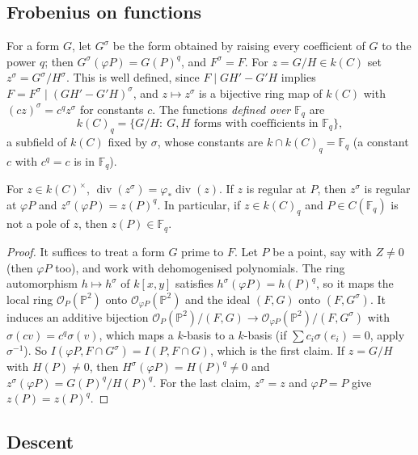 \subsection*{Frobenius on functions}

For a form $G$, let $G^\sigma$ be the form obtained by raising every coefficient of $G$ to the power $q$; then $G^\sigma(\varphi P)=G(P)^q$, and $F^\sigma=F$.
For $z=G/H\in k(C)$ set $z^\sigma=G^\sigma/H^\sigma$. This is well defined, since $F\mid GH'-G'H$ implies $F=F^\sigma\mid(GH'-G'H)^\sigma$, and
$z\mapsto z^\sigma$ is a bijective ring map of $k(C)$ with $(cz)^\sigma=c^qz^\sigma$ for constants $c$. The functions \emph{defined over $\mathbb F_q$} are
\[
k(C)_q=\{G/H:\ G,H\text{ forms with coefficients in }\mathbb F_q\},
\]
a subfield of $k(C)$ fixed by $\sigma$, whose constants are $k\cap k(C)_q=\mathbb F_q$ (a constant $c$ with $c^q=c$ is in $\mathbb F_q$).

\begin{lemma}\label{lem:frobdiv}
For $z\in k(C)^\times$, $\operatorname{div}(z^\sigma)=\varphi_*\operatorname{div}(z)$. If $z$ is regular at $P$, then $z^\sigma$ is regular at $\varphi P$ and
$z^\sigma(\varphi P)=z(P)^q$. In particular, if $z\in k(C)_q$ and $P\in C(\mathbb F_q)$ is not a pole of $z$, then $z(P)\in\mathbb F_q$.
\end{lemma}
\begin{proof}
It suffices to treat a form $G$ prime to $F$. Let $P$ be a point, say with $Z\ne0$ (then $\varphi P$ too), and work with dehomogenised polynomials. The ring
automorphism $h\mapsto h^\sigma$ of $k[x,y]$ satisfies $h^\sigma(\varphi P)=h(P)^q$, so it maps the local ring $\mathcal O_P(\mathbb P^2)$ onto
$\mathcal O_{\varphi P}(\mathbb P^2)$ and the ideal $(F,G)$ onto $(F,G^\sigma)$. It induces an additive bijection
$\mathcal O_P(\mathbb P^2)/(F,G)\to\mathcal O_{\varphi P}(\mathbb P^2)/(F,G^\sigma)$ with $\sigma(cv)=c^q\sigma(v)$, which maps a $k$-basis to a $k$-basis (if
$\sum c_i\sigma(e_i)=0$, apply $\sigma^{-1}$). So $I(\varphi P,F\cap G^\sigma)=I(P,F\cap G)$, which is the first claim. If $z=G/H$ with $H(P)\ne0$, then
$H^\sigma(\varphi P)=H(P)^q\ne0$ and $z^\sigma(\varphi P)=G(P)^q/H(P)^q$. For the last claim, $z^\sigma=z$ and $\varphi P=P$ give $z(P)=z(P)^q$.
\end{proof}

\subsection*{Descent}

